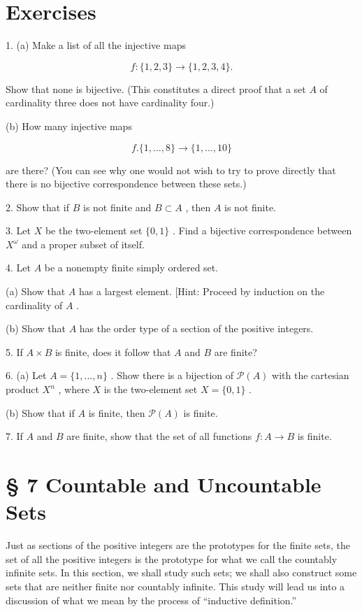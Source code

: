 \section*{Exercises}

1. (a) Make a list of all the injective maps

\[
f : \{ 1,2,3\}  \rightarrow  \{ 1,2,3,4\} .
\]

Show that none is bijective. (This constitutes a direct proof that a set \(A\) of cardinality three does not have cardinality four.)

(b) How many injective maps

\[
f.\{ 1,\ldots ,8\}  \rightarrow  \{ 1,\ldots ,{10}\}
\]

are there? (You can see why one would not wish to try to prove directly that there is no bijective correspondence between these sets.)

2. Show that if \(B\) is not finite and \(B \subset  A\) , then \(A\) is not finite.

3. Let \(X\) be the two-element set \(\{ 0,1\}\) . Find a bijective correspondence between \({X}^{\omega }\) and a proper subset of itself.

4. Let \(A\) be a nonempty finite simply ordered set.

(a) Show that \(A\) has a largest element. [Hint: Proceed by induction on the cardinality of \(A\) .

(b) Show that \(A\) has the order type of a section of the positive integers.

5. If \(A \times  B\) is finite, does it follow that \(A\) and \(B\) are finite?

6. (a) Let \(A = \{ 1,\ldots ,n\}\) . Show there is a bijection of \(\mathcal{P}\left( A\right)\) with the cartesian product \({X}^{n}\) , where \(X\) is the two-element set \(X = \{ 0,1\}\) .

(b) Show that if \(A\) is finite, then \(\mathcal{P}\left( A\right)\) is finite.

7. If \(A\) and \(B\) are finite, show that the set of all functions \(f : A \rightarrow  B\) is finite.

\section*{§ 7 Countable and Uncountable Sets}

Just as sections of the positive integers are the prototypes for the finite sets, the set of all the positive integers is the prototype for what we call the countably infinite sets. In this section, we shall study such sets; we shall also construct some sets that are neither finite nor countably infinite. This study will lead us into a discussion of what we mean by the process of ``inductive definition.''


